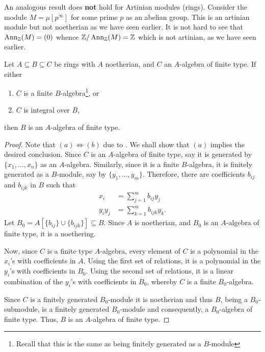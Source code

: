 An analogous result does \textbf{not} hold for Artinian modules (rings). Consider the module $M = {\mu}[p^\infty]$ for some prime $p$ as an abelian group. This is an artinian module but not noetherian as we have seen earlier. It is not hard to see that $\operatorname{Ann}_{\mathbb{Z}}(M) = (0)$ whence $\mathbb{Z}/\operatorname{Ann}_{\mathbb{Z}}(M) = \mathbb{Z}$ which is not artinian, as we have seen earlier.

\begin{lemma}
    Let $A\subseteq B\subseteq C$ be rings with $A$ noetherian, and $C$ an $A$-algebra of finite type. If either 
    \begin{enumerate}[label=(\alph*)]
        \item $C$ is a finite $B$-algebra\footnote{Recall that this is the same as being finitely generated as a $B$-module}, or 
        \item $C$ is integral over $B$,
    \end{enumerate}
    then $B$ is an $A$-algebra of finite type.
\end{lemma}
\begin{proof}
    Note that $(a)\iff(b)$ due to . We shall show that $(a)$ implies the desired conclusion. Since $C$ is an $A$-algebra of finite type, say it is generated by $\{x_1,\ldots,x_n\}$ as an $A$-algebra. Similarly, since it is a finite $B$-algebra, it is finitely generated as a $B$-module, say by $\{y_1,\ldots,y_m\}$. Therefore, there are coefficients $b_{ij}$ and $b_{ijk}$ in $B$ such that 
    \begin{align*}
        x_i &= \sum_{j = 1}^m b_{ij}y_j\\
        y_iy_j &= \sum_{k = 1}^m b_{ijk}y_k.
    \end{align*}
    Let $B_0 = A[\{b_{ij}\}\cup\{b_{ijk}\}]\subseteq B$. Since $A$ is noetherian, and $B_0$ is an $A$-algebra of finite type, it is a noethering. 
    
    Now, since $C$ is a finite type $A$-algebra, every element of $C$ is a polynomial in the $x_i$'s with coefficients in $A$. Using the first set of relations, it is a polynomial in the $y_i$'s with coefficients in $B_0$. Using the second set of relations, it is a linear combination of the $y_i$'s with coefficients in $B_0$, whereby $C$ is a finite $B_0$-algebra.

    Since $C$ is a finitely generated $B_0$-module it is noetherian and thus $B$, being a $B_0$-submodule, is a finitely generated $B_0$-module and consequently, a $B_0$-algebra of finite type. Thus, $B$ is an $A$-algebra of finite type.
\end{proof}

